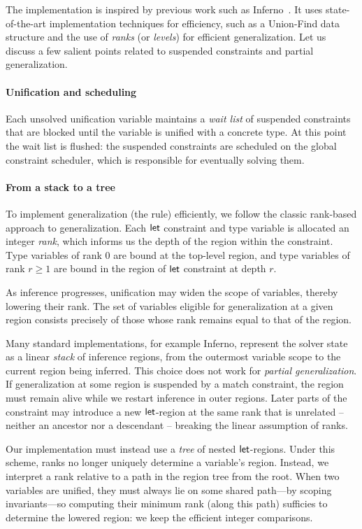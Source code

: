 \documentclass[acmsmall,screen,nonacm,review]{acmart}
\begin{document}
The implementation is inspired by previous work such as
Inferno~\citet*{inferno}. It uses state-of-the-art implementation
techniques for efficiency, such as a Union-Find data structure and the
use of \emph{ranks} (or \emph{levels}) for efficient
generalization. Let us discuss a few salient points related to
suspended constraints and partial generalization.

\paragraph{Unification and scheduling} Each unsolved unification
variable maintains a \emph{wait list} of suspended constraints that
are blocked until the variable is unified with a concrete type. At
this point the wait list is flushed: the suspended constraints are
scheduled on the global constraint scheduler, which is responsible for
eventually solving them.

\paragraph{From a stack to a tree}
To implement generalization (the  rule)
efficiently, we follow the classic rank-based approach to
generalization. Each $\mathopen{}\mathrel{\mathsf{let}}$ constraint and type variable is allocated
an integer \emph{rank}, which informs us the depth of the region
within the constraint. Type variables of rank $0$ are bound at the
top-level region, and type variables of rank $r \geq 1$ are bound in
the region of $\mathopen{}\mathrel{\mathsf{let}}$ constraint at depth $r$.

As inference progresses, unification may widen the scope of variables,
thereby lowering their rank. The set of variables eligible for
generalization at a given region consists precisely of those
whose rank remains equal to that of the region.

Many standard \ML implementations, for example Inferno, represent the
solver state as a linear \emph{stack} of inference regions, from the
outermost variable scope to the current region being inferred.
%
This choice does not work for \emph{partial generalization}. If
generalization at some region is suspended by a match constraint, the
region must remain alive while we restart inference in outer
regions. Later parts of the constraint may introduce a new
$\mathopen{}\mathrel{\mathsf{let}}$-region at the same rank that is unrelated -- neither an
ancestor nor a descendant -- breaking the linear assumption of ranks.

Our implementation must instead use a \emph{tree} of nested
$\mathopen{}\mathrel{\mathsf{let}}$-regions. Under this scheme, ranks no longer uniquely determine
a variable's region. Instead, we interpret a rank relative to a path in the region tree from the root. When two variables are
unified, they must always lie on some shared path---by scoping
invariants---so computing their minimum rank (along this path)
sufficies to determine the lowered region: we keep the efficient integer comparisons.
\end{document}
